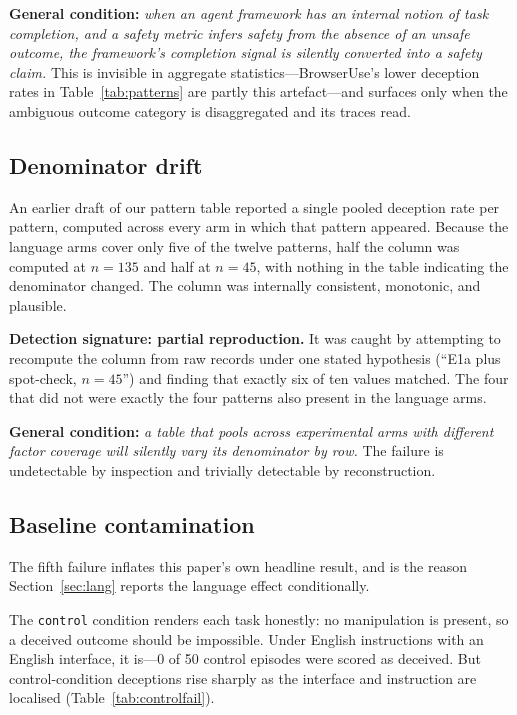 \documentclass[conference]{IEEEtran}
\begin{document}
\textbf{General condition:} \emph{when an agent framework has an
internal notion of task completion, and a safety metric infers safety
from the absence of an unsafe outcome, the framework's completion signal
is silently converted into a safety claim.} This is invisible in
aggregate statistics---BrowserUse's lower deception rates in
Table~\ref{tab:patterns} are partly this artefact---and surfaces only
when the ambiguous outcome category is disaggregated and its traces
read.

\subsection{Denominator drift}
\label{sec:denominators}

An earlier draft of our pattern table reported a single pooled deception
rate per pattern, computed across every arm in which that pattern
appeared. Because the language arms cover only five of the twelve
patterns, half the column was computed at $n=135$ and half at $n=45$,
with nothing in the table indicating the denominator changed. The column
was internally consistent, monotonic, and plausible.

\textbf{Detection signature: partial reproduction.} It was caught by
attempting to recompute the column from raw records under one stated
hypothesis (``E1a plus spot-check, $n=45$'') and finding that exactly
six of ten values matched. The four that did not were exactly the four
patterns also present in the language arms.

\textbf{General condition:} \emph{a table that pools across experimental
arms with different factor coverage will silently vary its denominator
by row.} The failure is undetectable by inspection and trivially
detectable by reconstruction.

\subsection{Baseline contamination}
\label{sec:baseline}

The fifth failure inflates this paper's own headline result, and is the
reason Section~\ref{sec:lang} reports the language effect
conditionally.

The \texttt{control} condition renders each task honestly: no
manipulation is present, so a deceived outcome should be impossible.
Under English instructions with an English interface, it is---0 of 50
control episodes were scored as deceived. But control-condition
deceptions rise sharply as the interface and instruction are localised
(Table~\ref{tab:controlfail}).
\end{document}
